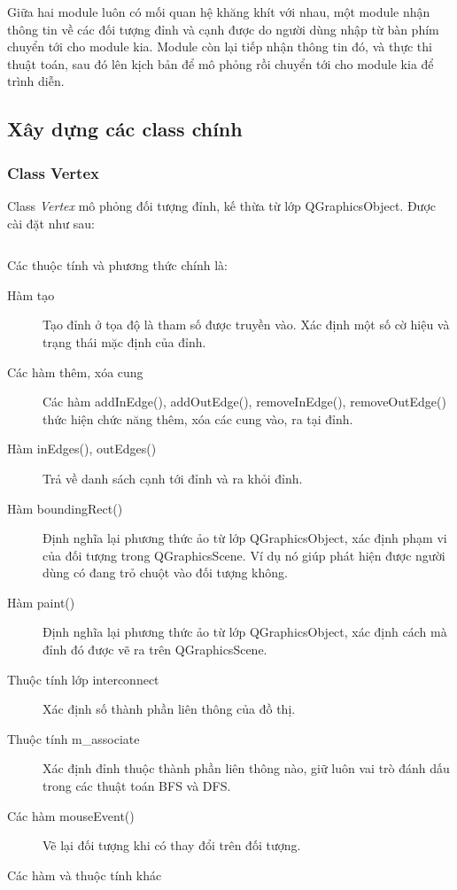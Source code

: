 \documentclass[a4paper,10pt]{article}
\newcommand{\mnt}[1]{\inputminted[frame=single, linenos=true, tabsize=4]{c++}{#1}}
\begin{document}
Giữa hai module luôn có mối quan hệ khăng khít với nhau, một module nhận thông tin về các đối tượng đỉnh và cạnh được do người dùng nhập từ bàn phím chuyển tới cho module kia. Module còn lại tiếp nhận thông tin đó, và thực thi thuật toán, sau đó lên kịch bản để mô phỏng rồi chuyển tới cho module kia để trình diễn.

\subsection{Xây dựng các class chính}
\subsubsection{Class Vertex}
Class \emph{Vertex } mô phỏng đối tượng đỉnh, kế thừa từ lớp QGraphicsObject. Được cài đặt như sau:
\mnt{images/vertex.h}

Các thuộc tính và phương thức chính là:
\begin{description}
\item[Hàm tạo] Tạo đỉnh ở tọa độ là tham số được truyền vào. Xác định một số cờ hiệu và trạng thái mặc định của đỉnh.
\item[Các hàm thêm, xóa cung] Các hàm \textsf{addInEdge(), addOutEdge(), removeInEdge(), removeOutEdge()} thức hiện chức năng thêm, xóa các cung vào, ra tại đỉnh.
\item[Hàm inEdges(), outEdges()] Trả về danh sách cạnh tới đỉnh và ra khỏi đỉnh.
\item[Hàm boundingRect()] Định nghĩa lại phương thức ảo từ lớp QGraphicsObject, xác định phạm vi của đối tượng trong QGraphicsScene. Ví dụ nó giúp phát hiện được người dùng có đang trỏ chuột vào đối tượng không.
\item[Hàm paint()] Định nghĩa lại phương thức ảo từ lớp QGraphicsObject, xác định cách mà đỉnh đó được vẽ ra trên QGraphicsScene.
\item[Thuộc tính lớp interconnect] Xác định số thành phần liên thông của đồ thị.
\item[Thuộc tính m\_associate] Xác định đỉnh thuộc thành phần liên thông nào, giữ luôn vai trò đánh dấu trong các thuật toán BFS và DFS.
\item[Các hàm mouseEvent()] Vẽ lại đối tượng khi có thay đổi trên đối tượng.
\item[Các hàm và thuộc tính khác]
\end{description}
\end{document}
